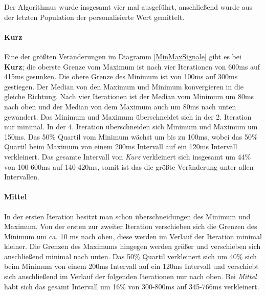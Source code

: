 Der Algorithmus wurde insgesamt vier mal ausgef{\"u}hrt, anschlie{\ss}end wurde aus der letzten Population der personalisierte Wert gemittelt. 

\paragraph{Kurz}
Eine der gr{\"o}{\ss}ten Ver{\"a}nderungen im Diagramm \autoref{MinMaxSignale} gibt es bei \textbf{Kurz}; die oberste Grenze vom Maximum ist nach vier Iterationen von 600ms auf 415ms gesunken. 
Die obere Grenze des Minimum ist von 100ms auf 300ms gestiegen. 
Der Median von den Maximum und Minimum konvergieren in die gleiche Richtung. 
Nach vier Iterationen ist der Median vom Minimum um 80ms nach oben und der Median von dem Maximum auch um 80ms nach unten gewandert. 
Das Minimum und Maximum {\"u}berschneidet sich in der 2. Iteration nur minimal. 
In der 4. Iteration {\"u}berschneiden sich Minimum und Maximum um 150ms. 
Das 50\% Quartil vom Minimum w{\"a}chst um bis zu 100ms, wobei das 50\% Quartil beim Maximum von einem 200ms Intervall auf ein 120ms Intervall verkleinert. 
Das gesamte Intervall von \textit{Kurz} verkleinert sich insgesamt um 44\% von 100-600ms auf 140-420ms, somit ist das die gr{\"o}{\ss}te Ver{\"a}nderung unter allen Intervallen.



\paragraph{Mittel}
In der ersten Iteration besitzt man schon {\"u}berschneidungen des Minimum und Maximum. 
Von der ersten zur zweiter Iteration verschieben sich die Grenzen des Minimum um ca. 10 ms nach oben, diese werden im Verlauf der Iteration minimal kleiner.  
Die Grenzen des Maximums hingegen werden gr{\"o}{\ss}er und verschieben sich anschlie{\ss}end minimal nach unten. 
Das 50\% Quartil verkleinert sich um 40\% sich beim Minimum von einem 200ms Intervall auf ein 120ms Intervall und verschiebt sich anschlie{\ss}end im Verlauf der folgenden Iterationen nur nach oben. 
Bei \textit{Mittel} habt sich das gesamt Intervall um 16\% von 300-800ms auf 345-766ms verkleinert.


